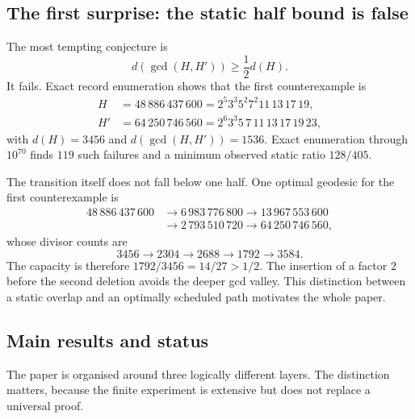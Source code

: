 \documentclass[11pt]{article}
\numberwithin{equation}{section}
\theoremstyle{blueplain}
\theoremstyle{bluedef}
\begin{document}
\subsection*{The first surprise: the static half bound is false}

The most tempting conjecture is
\begin{equation}
 d(\gcd(H,H'))\ge\frac12d(H).
 \label{eq:half-gcd-intro}
\end{equation}
It fails.  Exact record enumeration shows that the first counterexample is
\begin{align}
 H&=48\,886\,437\,600
   =2^5 3^3 5^2 7^2 11\,13\,17\,19,\nonumber\\
 H'&=64\,250\,746\,560
   =2^6 3^3 5\,7\,11\,13\,17\,19\,23,
 \label{eq:first-counterexample-intro}
\end{align}
with $d(H)=3456$ and $d(\gcd(H,H'))=1536$.  Exact enumeration through $10^{70}$ finds $119$ such failures and a minimum observed static ratio $128/405$.

The transition itself does not fall below one half.  One optimal geodesic for the first counterexample is
\begin{equation}
\begin{split}
48\,886\,437\,600
&\longrightarrow 6\,983\,776\,800
\longrightarrow 13\,967\,553\,600\\
&\longrightarrow 2\,793\,510\,720
\longrightarrow 64\,250\,746\,560,
\end{split}
\label{eq:first-counterexample-path-intro}
\end{equation}
whose divisor counts are
\[
3456\longrightarrow2304\longrightarrow2688\longrightarrow1792\longrightarrow3584.
\]
The capacity is therefore $1792/3456=14/27>1/2$.  The insertion of a factor $2$ before the second deletion avoids the deeper gcd valley.  This distinction between a static overlap and an optimally scheduled path motivates the whole paper.

\subsection*{Main results and status}

The paper is organised around three logically different layers.  The distinction matters, because the finite experiment is extensive but does not replace a universal proof.
\end{document}
